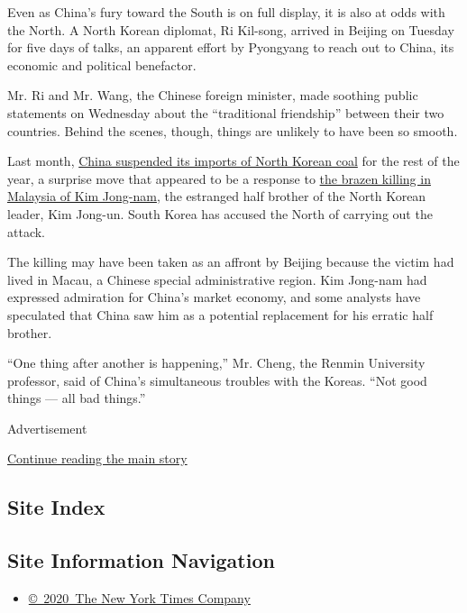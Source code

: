 Even as China's fury toward the South is on full display, it is also at
odds with the North. A North Korean diplomat, Ri Kil-song, arrived in
Beijing on Tuesday for five days of talks, an apparent effort by
Pyongyang to reach out to China, its economic and political benefactor.

Mr. Ri and Mr. Wang, the Chinese foreign minister, made soothing public
statements on Wednesday about the ``traditional friendship'' between
their two countries. Behind the scenes, though, things are unlikely to
have been so smooth.

Last month,
\href{https://www.nytimes.com/2017/02/18/world/asia/north-korea-china-coal-imports-suspended.html}{China
suspended its imports of North Korean coal} for the rest of the year, a
surprise move that appeared to be a response to
\href{https://www.nytimes.com/2017/03/01/world/asia/malaysia-kim-jong-nam-embassy-immunity.html}{the
brazen killing in Malaysia of Kim Jong-nam}, the estranged half brother
of the North Korean leader, Kim Jong-un. South Korea has accused the
North of carrying out the attack.

The killing may have been taken as an affront by Beijing because the
victim had lived in Macau, a Chinese special administrative region. Kim
Jong-nam had expressed admiration for China's market economy, and some
analysts have speculated that China saw him as a potential replacement
for his erratic half brother.

``One thing after another is happening,'' Mr. Cheng, the Renmin
University professor, said of China's simultaneous troubles with the
Koreas. ``Not good things --- all bad things.''

Advertisement

\protect\hyperlink{after-bottom}{Continue reading the main story}

\hypertarget{site-index}{%
\subsection{Site Index}\label{site-index}}

\hypertarget{site-information-navigation}{%
\subsection{Site Information
Navigation}\label{site-information-navigation}}

\begin{itemize}
\tightlist
\item
  \href{https://help.nytimes.com/hc/en-us/articles/115014792127-Copyright-notice}{©~2020~The
  New York Times Company}
\end{itemize}

